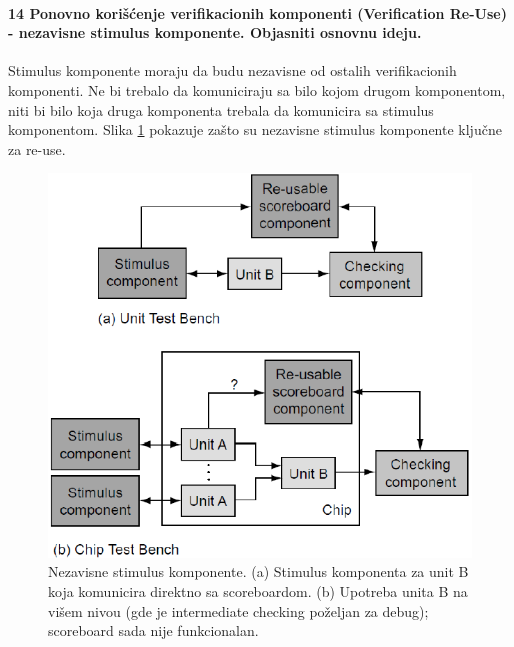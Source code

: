 \documentclass[a4paper, 12pt]{article}
\begin{document}
\paragraph{14 Ponovno korišćenje verifikacionih komponenti (Verification Re-Use) - nezavisne stimulus komponente. Objasniti osnovnu ideju.}
\hfill \break
\indent Stimulus komponente moraju da budu nezavisne od ostalih verifikacionih komponenti. Ne bi trebalo da komuniciraju sa bilo kojom drugom komponentom, niti bi bilo koja druga komponenta trebala da komunicira sa stimulus komponentom. Slika \ref{img9} pokazuje zašto su nezavisne stimulus komponente ključne za re-use.
\begin{figure}[h!]
\centering
\includegraphics[scale=0.5]{img9.png}
\caption{Nezavisne stimulus komponente. (a) Stimulus komponenta za unit B koja komunicira direktno sa scoreboardom. (b) Upotreba unita B na višem nivou (gde je intermediate checking poželjan za debug); scoreboard sada nije funkcionalan.}
\label{img9}
\end{figure}
\end{document}
